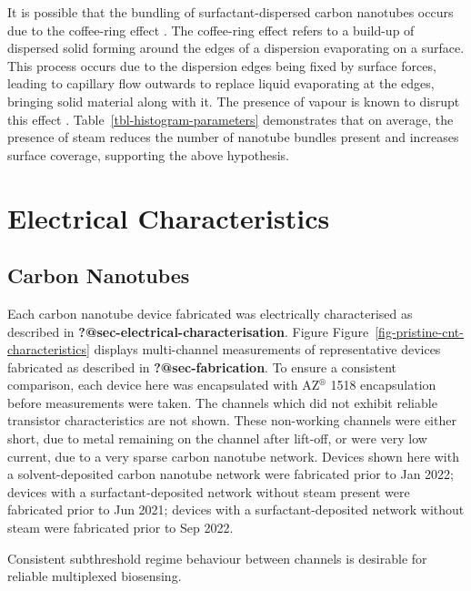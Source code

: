 \documentclass[
  a4paper,
]{scrbook}
\begin{document}
It is possible that the bundling of surfactant-dispersed carbon
nanotubes occurs due to the coffee-ring effect
\autocite{Deegan1997,VanGaalen2021}. The coffee-ring effect refers to a
build-up of dispersed solid forming around the edges of a dispersion
evaporating on a surface. This process occurs due to the dispersion
edges being fixed by surface forces, leading to capillary flow outwards
to replace liquid evaporating at the edges, bringing solid material
along with it. The presence of vapour is known to disrupt this effect
\autocite{Bishop2020}. Table~\ref{tbl-histogram-parameters} demonstrates
that on average, the presence of steam reduces the number of nanotube
bundles present and increases surface coverage, supporting the above
hypothesis.

\hypertarget{sec-pristine-electrical-characterisation}{%
\section{Electrical
Characteristics}\label{sec-pristine-electrical-characterisation}}

\hypertarget{carbon-nanotubes}{%
\subsection{Carbon Nanotubes}\label{carbon-nanotubes}}

Each carbon nanotube device fabricated was electrically characterised as
described in \textbf{?@sec-electrical-characterisation}. Figure
Figure~\ref{fig-pristine-cnt-characteristics} displays multi-channel
measurements of representative devices fabricated as described in
\textbf{?@sec-fabrication}. To ensure a consistent comparison, each
device here was encapsulated with AZ\(^\circledR\) 1518 encapsulation
before measurements were taken. The channels which did not exhibit
reliable transistor characteristics are not shown. These non-working
channels were either short, due to metal remaining on the channel after
lift-off, or were very low current, due to a very sparse carbon nanotube
network. Devices shown here with a solvent-deposited carbon nanotube
network were fabricated prior to Jan 2022; devices with a
surfactant-deposited network without steam present were fabricated prior
to Jun 2021; devices with a surfactant-deposited network without steam
were fabricated prior to Sep 2022.

Consistent subthreshold regime behaviour between channels is desirable
for reliable multiplexed biosensing.
\end{document}
